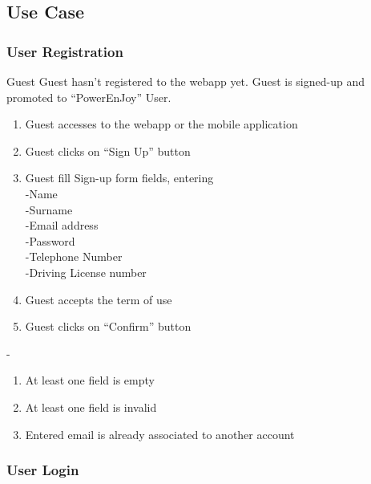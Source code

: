 \subsection{Use Case}

\subsubsection{User Registration}



	
	
	
				{Guest}
				{}
				{Guest hasn't registered to the webapp yet.}
				{Guest is signed-up and promoted to ``PowerEnJoy'' User.}
				{
					\begin{enumerate}
						\item Guest accesses to the webapp or the mobile application
						\item Guest clicks on ``Sign Up'' button
						\item Guest fill Sign-up form fields, entering\\
						-Name\\
						-Surname\\
						-Email address\\
						-Password\\
						-Telephone Number\\
						-Driving License number
						\item Guest accepts the term of use
						\item Guest clicks on ``Confirm'' button\end{enumerate}
				}
				{-}
				{
				\begin{enumerate}
					\item At least one field is empty
					\item At least one field is invalid
					\item Entered email is already associated to another account\end{enumerate}
				}
	



\pagebreak
\subsubsection{User Login}


